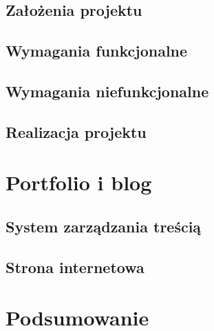 \documentclass[12pt]{article}
\numberwithin{figure}{section}
\begin{document}
\begin{sloppypar}

\subsection{Założenia projektu}


\subsection{Wymagania funkcjonalne}


\subsection{Wymagania niefunkcjonalne}



\subsection{Realizacja projektu}


\newpage

\section{Portfolio i blog}


\subsection{System zarządzania treścią}


\subsection{Strona internetowa}


\newpage 

\section{Podsumowanie}


\newpage 

%
    \listoffigures
    \clearpage


\end{sloppypar}
\end{document}
